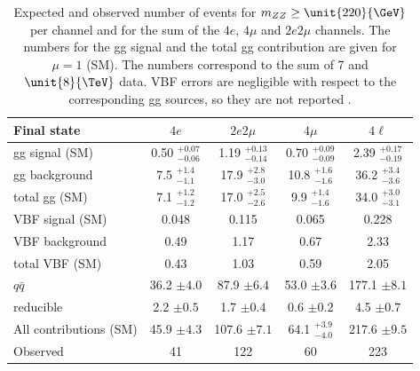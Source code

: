 \begin{table}
\begin{center}
\begin{tabular}{l|c|c|c|c}
 \hline
\hline
Final state & $4e$  &  $2e2\mu$  & $4\mu$  & $4\ell$ \\
\hline
gg signal (SM) &  0.50 $^{+0.07}_{-0.06}$ & 1.19 $^{+0.13}_{-0.14}$ &  0.70 $^{+0.09}_{-0.09}$ &  2.39 $^{+0.17}_{-0.19}$  \\
gg background &  7.5 $^{+1.4}_{-1.1}$  & 17.9 $^{+2.8}_{-3.0}$  & 10.8 $^{+1.6}_{-1.6}$ &  36.2 $^{+3.4}_{-3.6}$  \\
total gg (SM) & 7.1  $^{+1.2}_{-1.2}$ & 17.0 $^{+2.5}_{-2.6}$ & 9.9  $^{+1.4}_{-1.6}$ & 34.0 $^{+3.0}_{-3.1}$  \\
\hline
VBF signal (SM) & 0.048 & 0.115 & 0.065 & 0.228  \\                                                                       
VBF background & 0.49 & 1.17 & 0.67 & 2.33  \\                                                                             
total VBF (SM) & 0.43 & 1.03 & 0.59 & 2.05  \\
\hline
$q\bar{q}$ & 36.2 $\pm 4.0$  & 87.9 $\pm 6.4$  & 53.0 $\pm 3.6$  & 177.1 $\pm 8.1$   \\
reducible & 2.2 $\pm 0.5$ & 1.7 $\pm 0.4$ & 0.6 $\pm 0.2$ & 4.5 $\pm 0.7$  \\
\hline
All contributions (SM) & 45.9 $\pm 4.3$  & 107.6 $\pm 7.1$ & 64.1 $^{+3.9}_{-4.0}$  & 217.6 $\pm 9.5$ \\
\hline
Observed  & 41 & 122 & 60 & 223 \\
\hline
\end{tabular}
\caption[Expected and observed number of events for $m_{ZZ} \ge \unit{220}{\GeV}$ per channel and for the sum of the
$4e$, $4\mu$ and $2e2\mu$ channels. The numbers for the gg signal and the total gg contribution are given for $\mu=1$ (SM). 
The numbers correspond to the sum of 7 and $\unit{8}{\TeV}$ data. VBF errors are negligible with respect to the corresponding gg sources, 
so they are not reported.]{Expected and observed number of events for $m_{ZZ} \ge \unit{220}{\GeV}$ per channel and for the sum of the
$4e$, $4\mu$ and $2e2\mu$ channels. The numbers for the gg signal and the total gg contribution are given for $\mu=1$ (SM). 
The numbers correspond to the sum of 7 and $\unit{8}{\TeV}$ data. VBF errors are negligible with respect to the corresponding gg sources, 
so they are not reported \cite{Khachatryan:2014iha}.} 
\label{tab:4l_width_yields}
\end{center}
\end{table}

